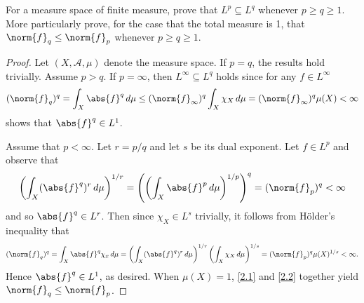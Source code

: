 \documentclass[12pt]{amsart}
\begin{document}
\begin{thm}[p. 436, Problem 1]\label{ex2}
  For a measure space of finite measure, prove that $L^p \subseteq L^q$ whenever $p \geq q \geq 1$.
  More particularly prove, for the case that the total measure is 1, that $\norm{f}_q \leq \norm{f}_p$ whenever $p \geq q \geq 1$.
  
  \begin{proof}
    Let $(X, \mathcal{A}, \mu)$ denote the measure space.
    If $p = q$, the results hold trivially.
    Assume $p > q$.
    If $p = \infty$, then $L^\infty \subseteq L^q$ holds since for any $f \in L^\infty$
    \begin{equation}\label{2.1}
      (\norm{f}_q)^q = \int_X \abs{f}^q\, d\mu \leq (\norm{f}_\infty)^q \int_X \chi_X\, d\mu = (\norm{f}_\infty)^q \mu(X) < \infty
    \end{equation}
    shows that $\abs{f}^q \in L^1$.
    
    Assume that $p < \infty$.
    Let $r = p/q$ and let $s$ be its dual exponent.
    Let $f \in L^p$ and observe that
    $$\left(\int_X (\abs{f}^q)^r\, d\mu\right)^{1/r} = \left(\left(\int_X \abs{f}^p\, d\mu\right)^{1/p}\right)^q = (\norm{f}_p)^q < \infty$$
    and so $\abs{f}^q \in L^r$.
    Then since $\chi_X \in L^s$ trivially, it follows from H\"older's inequality that
    \begin{equation}\label{2.2}
      (\norm{f}_q)^q = \int_X \abs{f}^q\chi_x\, d\mu = \left(\int_X (\abs{f}^q)^r\, d\mu\right)^{1/r} \left(\int_X \chi_X\, d\mu\right)^{1/s} = (\norm{f}_p)^q \mu(X)^{1/s}< \infty.
    \end{equation}
    Hence $\abs{f}^q \in L^1$, as desired.
    When $\mu(X) = 1$, \eqref{2.1} and \eqref{2.2} together yield $\norm{f}_q \leq \norm{f}_p$.
  \end{proof}
\end{thm}

\newpage
\end{document}
